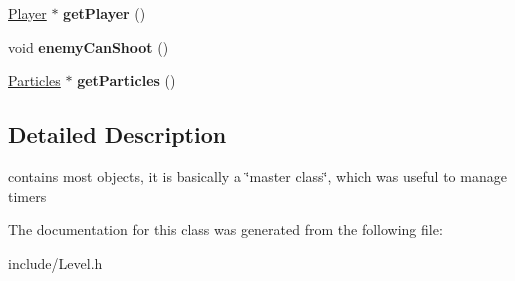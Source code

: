 \begin{DoxyCompactItemize}
\item 
\hyperlink{classPlayer}{Player} $\ast$ {\bfseries get\+Player} ()\hypertarget{classLevel_a583930f5b9967473062f8f3abdc780ef}{}\label{classLevel_a583930f5b9967473062f8f3abdc780ef}

\item 
void {\bfseries enemy\+Can\+Shoot} ()\hypertarget{classLevel_a20349e0b0cd045abcbc879f2ed38e5e4}{}\label{classLevel_a20349e0b0cd045abcbc879f2ed38e5e4}

\item 
\hyperlink{classParticles}{Particles} $\ast$ {\bfseries get\+Particles} ()\hypertarget{classLevel_aef4b5e429a6ca396591dc2014d088b2c}{}\label{classLevel_aef4b5e429a6ca396591dc2014d088b2c}

\end{DoxyCompactItemize}


\subsection{Detailed Description}
contains most objects, it is basically a \char`\"{}master class\char`\"{}, which was useful to manage timers 

The documentation for this class was generated from the following file\+:\begin{DoxyCompactItemize}
\item 
include/Level.\+h\end{DoxyCompactItemize}
